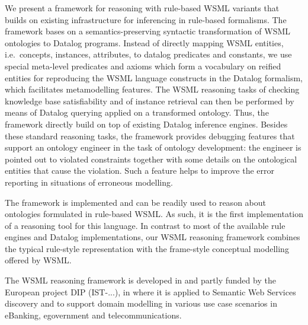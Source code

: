 We present a framework for reasoning with rule-based WSML variants
that builds on existing infrastructure for inferencing in
rule-based formalisms. The framework bases on a
semantics-preserving syntactic transformation of WSML ontologies
to Datalog programs. Instead of directly mapping WSML entities,
i.e.\ concepts, instances, attributes, to datalog predicates and
constants, we use special meta-level predicates and axioms which
form a vocabulary on reified entities for reproducing the WSML
language constructs in the Datalog formalism, which facilitates
metamodelling features. The WSML reasoning tasks of checking
knowledge base satisfiability and of instance retrieval can then
be performed by means of Datalog querying applied on a transformed
ontology. Thus, the framework directly build on top of existing
Datalog inference engines. Besides these standard reasoning tasks,
the framework provides debugging features that support an ontology
engineer in the task of ontology development: the engineer is
pointed out to violated constraints together with some details on
the ontological entities that cause the violation. Such a feature
helps to improve the error reporting in situations of erroneous
modelling.

The framework is implemented and can be readily used to reason
about ontologies formulated in rule-based WSML. As such, it is the
first implementation of a reasoning tool for this language. In
contrast to most of the available rule engines and Datalog
implementations, our WSML reasoning framework combines the typical
rule-style representation with the frame-style conceptual
modelling offered by WSML.

The WSML reasoning framework is developed in and partly funded by
the European project DIP (IST-...), in where it is applied to
Semantic Web Services discovery and to support domain modelling in
various use case scenarios in eBanking, egovernment and
telecommunications.
